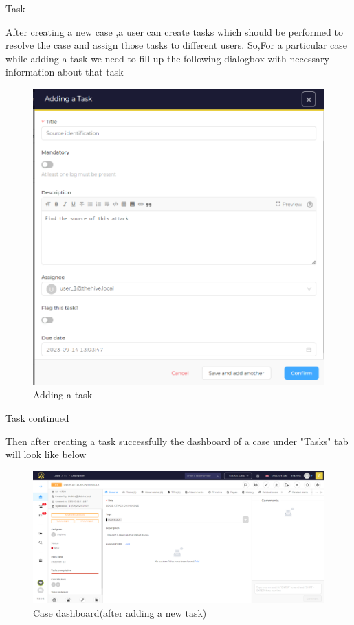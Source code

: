 \begin{frame}{Task}
\begin{justify}
After creating a new case ,a user can create tasks which should be performed to resolve the case and assign those tasks to different users.
So,For a particular case  while adding a task we need to fill up the following dialogbox with necessary information about that task
\begin{figure}[htp]
    \centering
    \includegraphics[scale = 0.28]{Adding a task.png}
    \caption{Adding a task}
    \label{Adding a task}
\end{figure}


\end{justify}

\end{frame}

\begin{frame}{Task continued}

Then after creating a task successfully the dashboard of a case under "Tasks" tab will look like below
\begin{figure}[htp]
    \centering
    \includegraphics[scale = 0.28]{case dashboard.png}
    \caption{Case dashboard(after adding a new task)}
    \label{Case dashboard(after adding a new task)}
\end{figure}

    
\end{frame}




